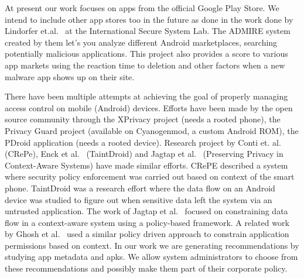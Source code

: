 At present our work focuses on apps from the official Google Play Store. We intend to include other app stores too in the future as done in the work done by Lindorfer et.al.~\cite{Lindorfer2014AndRadar} at the International Secure System Lab. The ADMIRE system created by them let's you analyze different Android marketplaces, searching potentially malicious applications. This project also provides a score to various app markets using the reaction time to deletion and other factors when a new malware app shows up on their site. 

There have been multiple attempts at achieving the goal of properly managing access control on mobile (Android) devices. Efforts have been made by the open source community through the XPrivacy project (needs a rooted phone), the Privacy Guard project (available on Cyanogenmod, a custom Android ROM), the PDroid application (needs a rooted device). Research project by Conti et. al.~\cite{conti2011crepe} (CRePe), Enck et al.~\cite{enck2010taintdroid} (TaintDroid) and Jagtap et al.~\cite{Jagtap2011Privacy} (Preserving Privacy in Context-Aware Systems) have made similar efforts. CRePE described a system where security policy enforcement was carried out based on context of the smart phone. TaintDroid was a research effort where the data flow on an Android device was studied to figure out when sensitive data left the system via an untrusted application. The work of Jagtap et al.~\cite{Jagtap2011Privacy} focused on constraining data flow in a context-aware system using a policy-based framework. A related work by Ghosh et al.~\cite{ghosh2012privacy} used a similar policy driven approach to constrain application permissions based on context. In our work we are generating recommendations by studying app metadata and apks. We allow system administrators to choose from these recommendations and possibly make them part of their corporate policy.